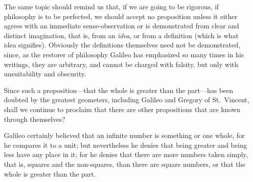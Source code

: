 \documentclass[polutonikogreek,english,twoside,openright]{article}
\begin{document}
The same topic should remind us that, if we are going to be rigorous, if
philosophy is to be perfected, we should accept no proposition unless it
either agrees with an immediate sense-observation or is demonstrated from
clear and distinct imagination, that is, from an {\em idea}, or from a
definition (which is what idea signifies).  Obviously the definitions
themselves need not be demonstrated, since, as the restorer of philosophy
Galileo has emphasized so many times in his writings, they are arbitrary, and
cannot be charged with falsity, but only with unsuitability and obscurity.

Since such a proposition---that the whole is greater than the part---has
been doubted by the greatest geometers, including Galileo and Gregory of
St.\ Vincent, shall we continue to proclaim that there are other propositions
that are known through themselves?

Galileo certainly believed that an infinite number is something or one whole,
for he compares it to a unit; but nevertheless he denies that being greater
and being less have any place in it; for he denies that there are more numbers
taken simply, that is, squares and the non-squares, than there are square
numbers, or that the whole is greater than the part.
\end{document}
